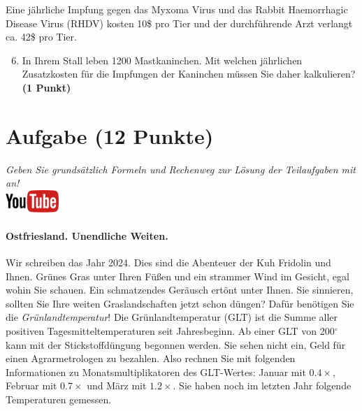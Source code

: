 \documentclass[a4paper, 9pt]{scrartcl}\usepackage[]{graphicx}\usepackage[]{xcolor}
\begin{document}
Eine j{\"a}hrliche Impfung gegen das Myxoma Virus und das Rabbit Haemorrhagic
Disease Virus (RHDV) kosten 10\$ pro Tier und der
durchf{\"u}hrende Arzt verlangt ca. 42\$ pro Tier.

\begin{enumerate}
  \setcounter{enumi}{5}
\item In Ihrem Stall leben 1200 Mastkaninchen. Mit welchen
  j{\"a}hrlichen Zusatzkosten f{\"u}r die Impfungen der Kaninchen m{\"u}ssen Sie daher
  kalkulieren? \textbf{(1 Punkt)}
\end{enumerate}
 
\clearpage

\section{Aufgabe \hfill (12 Punkte)}

\textit{Geben Sie grunds{\"a}tzlich Formeln und Rechenweg zur L{\"o}sung der
  Teilaufgaben mit an!} \\[1Ex]

\hfill\href{https://youtu.be/fiWGgCX-cE4}{\includegraphics[width =
  2cm]{img/youtube}} %
\hspace{2Ex}



\paragraph{Ostfriesland. Unendliche Weiten.}



Wir schreiben das Jahr 2024. Dies sind die Abenteuer
der Kuh Fridolin und Ihnen. Gr{\"u}nes Gras unter Ihren F{\"u}{\ss}en und
ein strammer Wind im Gesicht, egal wohin Sie schauen. Ein schmatzendes
Ger{\"a}usch ert{\"o}nt unter Ihnen. Sie sinnieren, sollten Sie Ihre weiten
Graslandschaften jetzt schon d{\"u}ngen?  Daf{\"u}r ben{\"o}tigen Sie die
\textit{Gr{\"u}nlandtemperatur}! Die Gr{\"u}nlandtemperatur (GLT) ist die Summe aller
positiven Tagesmitteltemperaturen seit Jahresbeginn. Ab einer GLT von
200$^\circ$ kann mit der Stickstoffd{\"u}ngung begonnen werden. Sie sehen nicht
ein, Geld f{\"u}r einen Agrarmetrologen zu bezahlen. Also rechnen Sie mit
folgenden Informationen zu Monatsmultiplikatoren des GLT-Wertes: Januar mit
$0.4\times$, Februar mit $0.7\times$ und M{\"a}rz mit
$1.2\times$. Sie haben noch im letzten Jahr folgende Temperaturen
gemessen.
\end{document}
